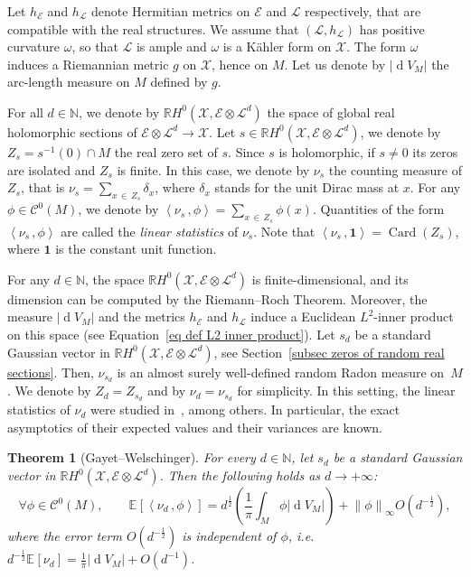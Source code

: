 \documentclass[10pt]{amsart}
\newtheorem{theo}{Theorem}[section]
\theoremstyle{definition}\newtheorem{defi}[theo]{Definition}\newtheorem{rema}[theo]{Remark}\newtheorem{exam}[theo]{Example}\newtheorem{exem}[theo]{Example}\newtheorem{nota}[theo]{Notation}
\DeclareMathOperator{\card}{Card}
\DeclareMathOperator{\dmesure}{d}
\newcommand{\E}{\mathcal{E}}
\newcommand{\X}{\mathcal{X}}
\renewcommand{\L}{\mathcal{L}}
\newcommand{\clC}{\mathcal{C}}
\newcommand{\N}{\mathbb{N}}
\newcommand{\R}{\mathbb{R}}
\newcommand{\bfun}{\mathbf{1}}
\newcommand{\esp}[2][]{\mathbb{E}_{#1}\!\left[#2 \right]}
\newcommand{\norm}[1]{\left\lvert #1 \right\rvert}
\newcommand{\Norm}[1]{\left\lVert #1 \right\rVert}
\newcommand{\prsc}[2]{\left\langle #1\,, #2 \right\rangle}
\newcommand{\rmes}[1]{\norm{\dmesure\! V_{#1}}}
\renewcommand{\H}{H^0(\X,\E \otimes \L^d)}
\let\oldforall\forall
\renewcommand*{\forall}{\mathrel{\oldforall}}
\begin{document}
Let $h_\E$ and $h_\L$ denote Hermitian metrics on $\E$ and $\L$ respectively, that are compatible with the real structures. We assume that $(\L,h_\L)$ has positive curvature $\omega$, so that $\L$ is ample and $\omega$ is a K\"ahler form on $\X$. The form $\omega$ induces a Riemannian metric $g$ on $\X$, hence on $M$. Let us denote by $\rmes{M}$ the arc-length measure on $M$ defined by $g$.

For all $d \in \N$, we denote by $\R \H$ the space of global real holomorphic sections of $\E \otimes \L^d \to \X$. Let $s \in \R \H$, we denote by $Z_s=s^{-1}(0)\cap M$ the real zero set of $s$. Since $s$ is holomorphic, if $s \neq 0$ its zeros are isolated and $Z_s$ is finite. In this case, we denote by $\nu_s$ the counting measure of $Z_s$, that is $\nu_s = \sum_{x\,\in\, Z_s} \delta_x$, where $\delta_x$ stands for the unit Dirac mass at $x$. For any $\phi \in \clC^0(M)$, we denote by $\prsc{\nu_s}{\phi} = \sum_{x\,\in\,Z_s} \phi(x)$. Quantities of the form $\prsc{\nu_s}{\phi}$ are called the \emph{linear statistics} of $\nu_s$. Note that $\prsc{\nu_s}{\bfun} = \card(Z_s)$, where $\bfun$ is the constant unit function.

For any $d \in \N$, the space $\R \H$ is finite-dimensional, and its dimension can be computed by the Riemann--Roch Theorem. Moreover, the measure $\rmes{M}$ and the metrics $h_\E$ and $h_\L$ induce a Euclidean $L^2$-inner product on this space (see Equation~\eqref{eq def L2 inner product}). Let $s_d$ be a standard Gaussian vector in $\R \H$, see Section~\ref{subsec zeros of random real sections}. Then, $\nu_{s_d}$ is an almost surely well-defined random Radon measure on~$M$. We denote by $Z_d = Z_{s_d}$ and by $\nu_d = \nu_{s_d}$ for simplicity. In this setting, the linear statistics of $\nu_d$ were studied in~\cite{Anc2019,GW2016,Let2016,LP2019}, among others. In particular, the exact asymptotics of their expected values and their variances are known.

\begin{theo}[{Gayet--Welschinger}]\label{thm expectation}
For every $d \in \N$, let $s_d$ be a standard Gaussian vector in $\R \H$. Then the following holds as $d \to +\infty$:
\[
\forall \phi \in \clC^0(M), \qquad \esp{\prsc{\nu_d}{\phi}} = d^\frac{1}{2} \left(\frac{1}{\pi}\int_M \phi \rmes{M}\right) + \Norm{\phi}_\infty O\left(d^{-\frac{1}{2}}\right),
\]
where the error term $O(d^{-\frac{1}{2}})$ is independent of $\phi$, i.e. $d^{-\frac{1}{2}}\esp{\nu_d} = \frac{1}{\pi}\rmes{M} + O(d^{-1})$.
\end{theo}
\end{document}
